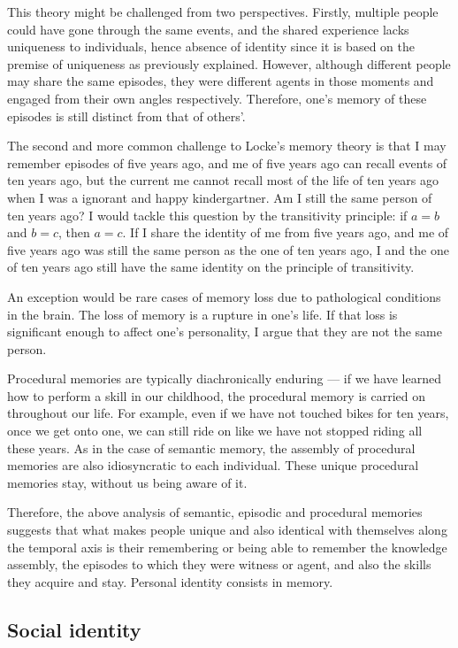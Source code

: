 \documentclass[a4paper,english,12pt]{scrartcl}
\begin{document}
This theory might be challenged from two perspectives. Firstly, multiple
people could have gone through the same events, and the shared experience
lacks uniqueness to individuals, hence absence of identity since it
is based on the premise of uniqueness as previously explained. However,
although different people may share the same episodes, they were different
agents in those moments and engaged from their own angles respectively.
Therefore, one's memory of these episodes is still distinct from that
of others'.

The second and more common challenge to Locke's memory theory is that
I may remember episodes of five years ago, and me of five years ago
can recall events of ten years ago, but the current me cannot recall
most of the life of ten years ago when I was a ignorant and happy
kindergartner. Am I still the same person of ten years ago? I would
tackle this question by the transitivity principle: if $a=b$ and
$b=c$, then $a=c$. If I share the identity of me from five years
ago, and me of five years ago was still the same person as the one
of ten years ago, I and the one of ten years ago still have the same
identity on the principle of transitivity.

An exception would be rare cases of memory loss due to pathological
conditions in the brain. The loss of memory is a rupture in one's
life. If that loss is significant enough to affect one's personality,
I argue that they are not the same person.

Procedural memories are typically diachronically enduring --- if
we have learned how to perform a skill in our childhood, the procedural
memory is carried on throughout our life. For example, even if we
have not touched bikes for ten years, once we get onto one, we can
still ride on like we have not stopped riding all these years. As
in the case of semantic memory, the assembly of procedural memories
are also idiosyncratic to each individual. These unique procedural
memories stay, without us being aware of it.

Therefore, the above analysis of semantic, episodic and procedural
memories suggests that what makes people unique and also identical
with themselves along the temporal axis is their remembering or being
able to remember the knowledge assembly, the episodes to which they
were witness or agent, and also the skills they acquire and stay.
Personal identity consists in memory.

\subsection{Social identity}
\end{document}
